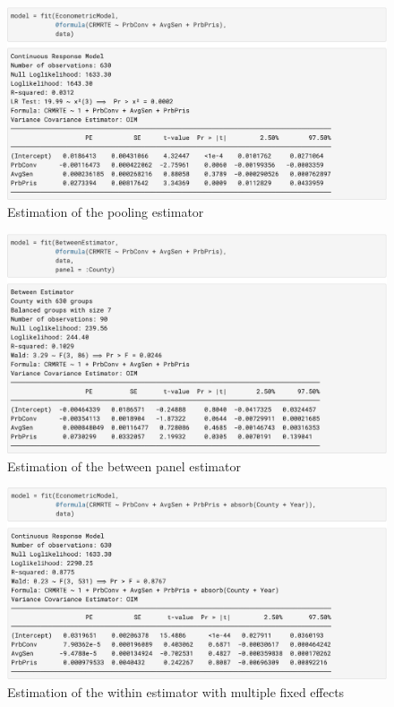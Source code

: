 \documentclass{juliacon}
\begin{document}
\begin{figure}[hbpt]
    \includegraphics[max width=\linewidth,center]{estimator_pooling}
	\caption{Estimation of the pooling estimator}
	\label{estimator_pooling}
\end{figure}

\begin{figure}[hbpt]
    \includegraphics[max width=\linewidth,center]{estimator_between}
	\caption{Estimation of the between panel estimator}
	\label{estimator_between}
\end{figure}

\begin{figure}[hbpt]
	\includegraphics[max width=\linewidth,center]{estimator_fe}
	\caption{Estimation of the within estimator with multiple fixed effects}
	\label{withinmodel}
\end{figure}
\end{document}
